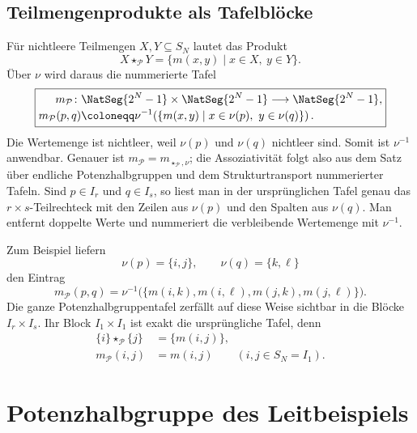 \documentclass[main.tex]{subfiles}
\begin{document}
\subsection{Teilmengenprodukte als Tafelblöcke}

Für nichtleere Teilmengen \(X,Y\subseteq S_N\) lautet das Produkt
\[
  X\star_{\mathcal P}Y
  =
  \{m(x,y)\mid x\in X,\ y\in Y\}.
\]
Über \(\nu\) wird daraus die nummerierte Tafel
\[
  \boxed{
  \begin{aligned}
  m_{\mathcal P}\colon{}
    &\NatSeg{2^N-1}\times\NatSeg{2^N-1}
      \longrightarrow\NatSeg{2^N-1},\\[-2pt]
  m_{\mathcal P}(p,q)
    &\coloneqq
      \nu^{-1}\!\left(
        \{m(x,y)\mid x\in\nu(p),\ y\in\nu(q)\}
      \right).
  \end{aligned}}
\]
Die Wertemenge ist nichtleer, weil \(\nu(p)\) und \(\nu(q)\) nichtleer
sind.  Somit ist \(\nu^{-1}\) anwendbar.  Genauer ist
\(m_{\mathcal P}=m_{\star_{\mathcal P},\nu}\); die Assoziativität folgt
also aus dem Satz über endliche Potenzhalbgruppen und dem Strukturtransport
nummerierter Tafeln.
Sind \(p\in I_r\) und \(q\in I_s\), so liest man in der ursprünglichen
Tafel genau das \(r\times s\)-Teilrechteck mit den Zeilen aus \(\nu(p)\) und
den Spalten aus \(\nu(q)\).  Man entfernt doppelte Werte und nummeriert die
verbleibende Wertemenge mit \(\nu^{-1}\).

Zum Beispiel liefern
\[
  \nu(p)=\{i,j\},
  \qquad
  \nu(q)=\{k,\ell\}
\]
den Eintrag
\[
  m_{\mathcal P}(p,q)
  =
  \nu^{-1}\!\bigl(
    \{m(i,k),m(i,\ell),m(j,k),m(j,\ell)\}
  \bigr).
\]
Die ganze Potenzhalbgruppentafel zerfällt auf diese Weise sichtbar in die
Blöcke \(I_r\times I_s\).  Ihr Block \(I_1\times I_1\) ist exakt die
ursprüngliche Tafel, denn
\[
\begin{aligned}
  \{i\}\star_{\mathcal P}\{j\}&=\{m(i,j)\},\\
  m_{\mathcal P}(i,j)&=m(i,j)
    \qquad(i,j\in S_N=I_1).
\end{aligned}
\]


\section{Potenzhalbgruppe des Leitbeispiels}
\end{document}

